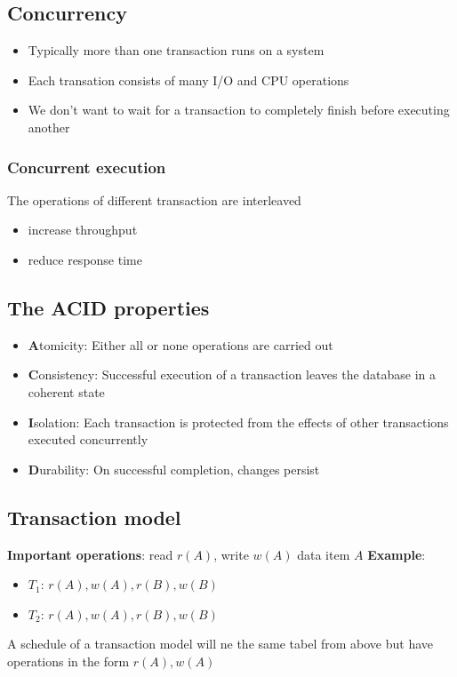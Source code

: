 \documentclass{article}
\begin{document}
\subsection{Concurrency}
\begin{itemize}
  \item Typically more than one transaction runs on a system
  \item Each transation consists of many I/O and CPU operations
  \item We don’t want to wait for a transaction to completely finish before executing another
\end{itemize}

\subsubsection*{Concurrent execution}
The operations of different transaction are interleaved
\begin{itemize}
  \item increase throughput
  \item reduce response time
\end{itemize}

\subsection{The ACID properties}
\begin{itemize}
  \item \textbf{A}tomicity: Either all or none operations are carried out
  \item \textbf{C}onsistency: Successful execution of a transaction leaves the database in a coherent state
  \item \textbf{I}solation: Each transaction is protected from the effects of other transactions executed concurrently
  \item \textbf{D}urability: On successful completion, changes persist
\end{itemize}

\subsection{Transaction model}
\textbf{Important operations}: read $r(A)$, write $w(A)$ data item $A$
\textbf{Example}:
\begin{itemize}
  \item $T_1$: $r(A),w(A),r(B),w(B)$
  \item $T_2$: $r(A),w(A),r(B),w(B)$
\end{itemize}
A schedule of a transaction model will ne the same tabel from above but have operations in the form $r(A),w(A)$
\end{document}
